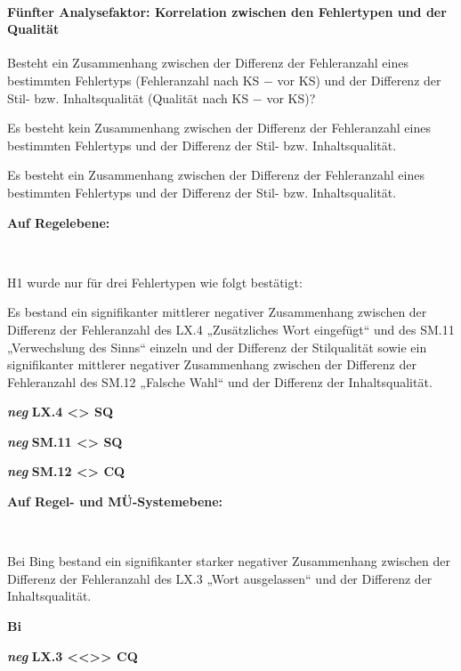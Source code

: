 \paragraph*{Fünfter Analysefaktor: Korrelation zwischen den Fehlertypen und der Qualität}
\begin{description}[font=\normalfont\bfseries]
\item [Fragestellung:] Besteht ein Zusammenhang zwischen der Differenz der Fehleranzahl eines bestimmten Fehlertyps (Fehleranzahl nach KS $-$ vor KS) und der Differenz der Stil- bzw. Inhaltsqualität (Qualität nach KS $-$ vor KS)?
\item [H0 --] Es besteht kein Zusammenhang zwischen der Differenz der Fehleranzahl eines bestimmten Fehlertyps und der Differenz der Stil- bzw. Inhaltsqualität.
\item [H1 --] Es besteht ein Zusammenhang zwischen der Differenz der Fehleranzahl eines bestimmten Fehlertyps und der Differenz der Stil- bzw. Inhaltsqualität.
\item [Resultat]
\end{description}
\noindent
\parbox[t]{.7\textwidth}{\textbf{Auf Regelebene:}}\\
\noindent
\parbox[t]{.7\textwidth}{
H1 wurde nur für drei Fehlertypen wie folgt bestätigt:

Es bestand ein signifikanter mittlerer negativer Zusammenhang zwischen der Differenz der Fehleranzahl des LX.4 „Zusätzliches Wort eingefügt“ und des SM.11 „Verwechslung des Sinns“ einzeln und der Differenz der Stilqualität sowie ein signifikanter mittlerer negativer Zusammenhang zwischen der Differenz der Fehleranzahl des SM.12 „Falsche Wahl“ und der Differenz der Inhaltsqualität.}
\parbox[t]{.04\textwidth}{}
\colorbox{smGreen}{\parbox[t]{.25\textwidth}{\textbf{\textit{neg}} \textbf{LX.4 <> SQ}

\textbf{\textit{neg}} \textbf{SM.11 <> SQ}

\textbf{\textit{neg}} \textbf{SM.12 <> CQ}\vspace{79pt}}}

\noindent
\parbox[t]{.7\textwidth}{\textbf{Auf Regel- und MÜ-Systemebene:}}\\
\noindent
\parbox[t]{.7\textwidth}{
Bei Bing bestand ein signifikanter starker negativer Zusammenhang zwischen der Differenz der Fehleranzahl des LX.3 „Wort ausgelassen“ und der Differenz der Inhaltsqualität.}
\parbox[t]{.04\textwidth}{}
\colorbox{smGreen}{\parbox[t]{.25\textwidth}{\textbf{Bi}

 \textbf{\textit{neg}} \textbf{LX.3 <{}<{}>{}> CQ}\vspace{29pt}}}

